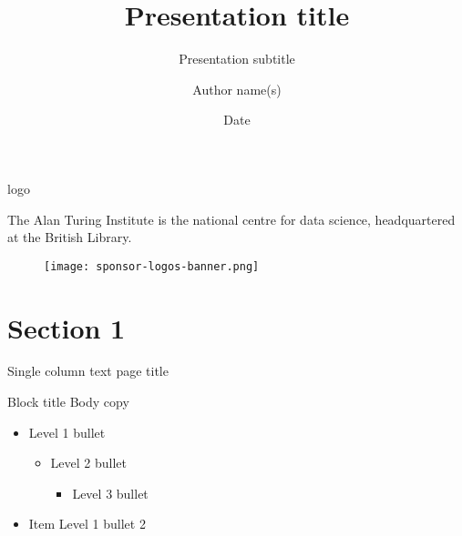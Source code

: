 \documentclass[t]{beamer}
\title{Presentation title}
\subtitle{Presentation subtitle}
\date{Date}
\author{Author name(s)}
\begin{document}
\begin{frame}
	\titlepage
\end{frame}

\begin{frame}	
		\gridblock
		\begin{beamercolorbox}[wd=\textwidth,leftskip=0\textwidth,sep=0px]{logo}
    		\end{beamercolorbox}%
		\gridblock
    		\begin{beamercolorbox}[wd=0.6\textwidth,leftskip=0\textwidth,sep=0px]{}
     		The Alan Turing Institute is the 
			national centre for data science, 
			headquartered at the British Library.
    		\end{beamercolorbox}%
		\vfill\vfill\vfill\vfill
    		\begin{beamercolorbox}[wd=\textwidth,leftskip=0\textwidth,sep=0px]{}
			\begin{figure}
				\texttt{[image: sponsor-logos-banner.png]}%
			\end{figure}
    		\end{beamercolorbox}%
\end{frame}

\section{Section 1}

\begin{frame}{Single column text page title}
	\begin{block}{Block title}
  		Body copy
  		\begin{itemize}    
  			\item Level 1 bullet
			\begin{itemize}
					\item Level 2 bullet
					\begin{itemize}
						\item Level 3 bullet
					\end{itemize}
			\end{itemize}
  			\item Item Level 1 bullet 2
  		\end{itemize}    
	\end{block}
\end{frame}
\end{document}
